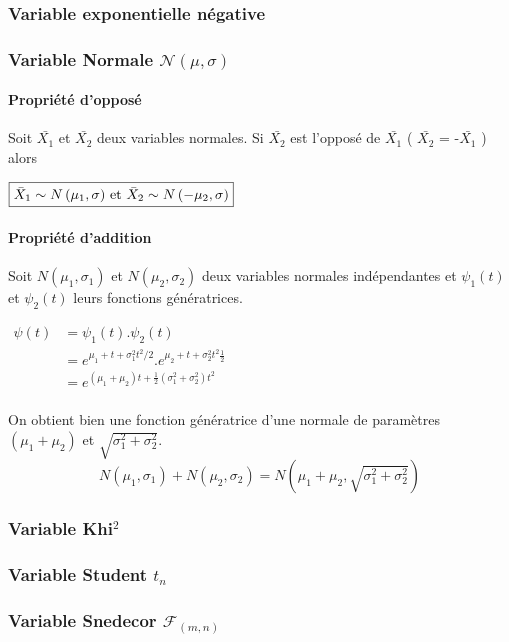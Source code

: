 \newpage
\subsubsection{Variable exponentielle négative}
\subsubsection{Variable Normale $\mathcal{N}(\mu,\sigma)$}


\paragraph{Propriété d'opposé}\label{propriete-normale-oppose}
Soit $\bar{X_1}$ et $\bar{X_2}$ deux variables normales. Si $\bar{X_2}$ est l'opposé de $\bar{X_1}$ ( $\bar{X_2}$ = -$\bar{X_1}$ ) alors
\begin{center}
$\boxed{\bar{X}_1 \sim N \left( \mu_1, \sigma \right)$ et $\bar{X}_2 \sim N \left( -\mu_2, \sigma \right)}$
\end{center}




\paragraph{Propriété d'addition}\label{propriete-normale-addition}
Soit $N(\mu_1,\sigma_1)$ et $N(\mu_2,\sigma_2)$ deux variables normales indépendantes et $\psi_1(t)$ et $\psi_2(t)$ leurs fonctions génératrices.
\begin{center}
$\begin{array}{LL}
\psi(t) &= \psi_1(t).\psi_2(t)\\
        &= e^{\mu_1+t+\sigma_1^2t^2/2}.e^{\mu_2+t+\sigma_2^2t^2\frac{1}{2}}\\
        &= e^{(\mu_1+\mu_2)t+\frac{1}{2}(\sigma_1^2+\sigma_2^2)t^2}\\
\end{array}$
\end{center}
On obtient bien une fonction génératrice d'une normale de paramètres $(\mu_1+\mu_2)$ et $\sqrt{\sigma_1^2+\sigma_2^2}$.
$$\boxed{N(\mu_1,\sigma_1) + N(\mu_2,\sigma_2) = N\left(\mu_1+\mu_2,\sqrt{\sigma_1^2+\sigma_2^2}\right)}$$



\subsubsection{Variable Khi$^2$}
\subsubsection{Variable Student $t_n$}
\label{propriete-student}
\subsubsection{Variable Snedecor $\mathcal{F}_{(m,n)}$}


